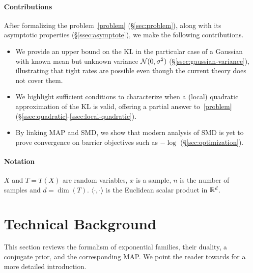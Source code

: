 \paragraph{Contributions}
After formalizing the problem~\eqref{problem} (\S\ref{sec:problem}), along with its asymptotic properties (\S\ref{ssec:asymptote}), we make the following contributions.
\begin{itemize}
	\itemsep0em
	\item We provide an upper bound on the KL in the particular case of a Gaussian with known mean but unknown variance ${\mathcal N}(0,\sigma^2)$ (\S\ref{ssec:gaussian-variance}), illustrating that tight rates are possible even though the current theory does not cover them.
	\item We highlight sufficient conditions to characterize when a (local) quadratic approximation of the KL is valid, offering a partial answer to~\eqref{problem} (\S\ref{ssec:quadratic}-\ref{ssec:local-quadratic}).
	\item By linking MAP and SMD, we show that modern analysis of SMD is yet to prove convergence on barrier objectives such as $-\log$ (\S\ref{sec:optimization}).
\end{itemize}


\paragraph{Notation}
$X$ and $T=T(X)$ are random variables, $x$ is a sample, $n$ is the number of samples and $d= \dim(T)$.
$\langle \cdot , \cdot \rangle$ is the Euclidean scalar product in $\mathbb{R}^d$.


\section{Technical Background}
\label{sec:background}
This section reviews the formalism of exponential families, their duality, a conjugate prior, and the corresponding MAP.
We point the reader towards \citet[Chapter 3]{wainwright2008graphical} for a more detailed introduction.


